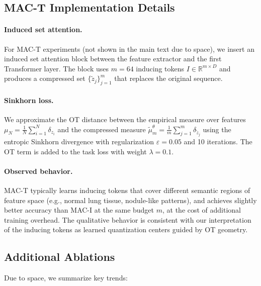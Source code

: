 \documentclass{article}
\theoremstyle{plain}
\theoremstyle{definition}
\theoremstyle{remark}
\newcommand{\muN}{\mu_N} %
\begin{document}
\subsection{MAC-T Implementation Details}
\label{app:exp_mact_details}

\paragraph{Induced set attention.}
For MAC-T experiments (not shown in the main text due to space), we insert an induced
set attention block \citep{lee2019set} between the feature extractor and the first
Transformer layer. The block uses $m=64$ inducing tokens $I\in\mathbb{R}^{m\times D}$ and
produces a compressed set $\{\tilde{z}_j\}_{j=1}^m$ that replaces the original sequence.

\paragraph{Sinkhorn loss.}
We approximate the OT distance between the empirical measure over features
$\muN = \frac{1}{N}\sum_{i=1}^N\delta_{z_i}$ and the compressed measure
$\tilde\mu_m^\theta = \frac{1}{m}\sum_{j=1}^m\delta_{\tilde{z}_j}$ using the entropic
Sinkhorn divergence \citep{cuturi2013sinkhorn} with regularization
$\varepsilon=0.05$ and 10 iterations. The OT term is added to the task loss with weight
$\lambda=0.1$.

\paragraph{Observed behavior.}
MAC-T typically learns inducing tokens that cover different semantic regions of feature
space (e.g., normal lung tissue, nodule-like patterns), and achieves slightly better
accuracy than MAC-I at the same budget $m$, at the cost of additional training
overhead. The qualitative behavior is consistent with our interpretation of the inducing
tokens as learned quantization centers guided by OT geometry.

\subsection{Additional Ablations}

Due to space, we summarize key trends:
\end{document}
